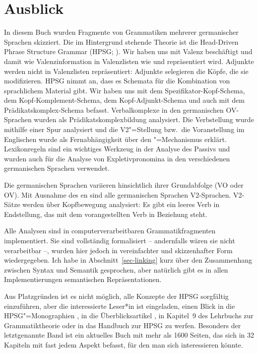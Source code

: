 
\chapter{Ausblick}
\label{chap-outlook}

In diesem Buch wurden Fragmente von Grammatiken mehrerer germanischer Sprachen skizziert. Die im
Hintergrund stehende Theorie ist die Head-Driven Phrase Structure Grammar (HPSG\indexhpsg;
\citealp*{ps,ps2,MuellerLehrbuch4,HPSGHandbook}). Wir haben uns mit Valenz beschäftigt und damit wie
Valenzinformation in Valenzlisten wie \spr und \comps repräsentiert wird. Adjunkte werden nicht
in Valenzlisten repräsentiert: Adjunkte selegieren die Köpfe, die sie modifizieren. HPSG nimmt an, dass es Schemata
für die Kombination von sprachlichem Material gibt. Wir haben uns mit dem Spezifikator-Kopf-Schema, dem
Kopf-Komplement-Schema, dem Kopf-Adjunkt-Schema und auch mit dem Prädikatskomplex-Schema befasst. Verbalkomplexe
in den germanischen OV-Sprachen wurden als Prädikatskomplexbildung analysiert. Die
Verbstellung wurde mithilfe einer Spur analysiert und die V2"=Stellung bzw.\ die Voranstellung im
Englischen wurde als Fernabhängigkeit über den \slasch"=Mechanismus erklärt. Lexikonregeln sind ein
wichtiges Werkzeug in der Analyse des Passivs und wurden auch für die Analyse von Expletivpronomina
in den verschiedenen germanischen Sprachen verwendet. 

Die germanischen Sprachen variieren hinsichtlich ihrer Grundabfolge (VO oder OV). Mit Ausnahme des en
sind alle germanischen Sprachen V2-Sprachen. V2-Sätze werden über Kopfbewegung analysiert: Es gibt ein
leeres Verb in Endstellung, das mit dem vorangestellten Verb in Beziehung steht.

Alle Analysen sind in computerverarbeitbaren Grammatikfragmenten implementiert. Sie sind vollständig formalisiert –
andernfalls wären sie nicht verarbeitbar –, wurden hier jedoch in vereinfachter und skizzenhafter
Form wiedergegeben. Ich habe in Abschnitt~\ref{sec-linking} kurz über den Zusammenhang zwischen Syntax und Semantik gesprochen, aber
natürlich gibt es in allen Implementierungen semantischen Repräsentationen.

Aus Platzgründen ist es nicht möglich, alle Konzepte der HPSG sorgfältig einzuführen, aber die
interessierte Leser*in ist eingeladen, einen Blick in die HPSG"=Monographien
\parencites{ps}{ps2}{GSag2000a-u}{MuellerLehrbuch4}, in die Überblicksartikel
\parencites{LM2006a}{PK2006a-u}{Bildhauer2014a-u}{MuellerHPSGHandbook,MuellerCurrentApproaches}, in Kapitel~9 des
Lehrbuchs zur Grammatiktheorie \citep{MuellerGT-Eng5} oder in das Handbuch zur HPSG
\citep{HPSGHandbook} zu werfen. Besonders der letztgenannte Band ist ein aktuelles Buch mit mehr als 1600 Seiten,
das sich in 32 Kapiteln mit fast jedem Aspekt befasst, für den man sich interessieren könnte.







